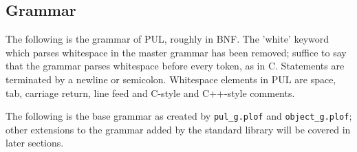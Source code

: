 \subsection{Grammar}

The following is the grammar of PUL, roughly in BNF. The 'white' keyword which parses whitespace in the master grammar has been removed; suffice to say that the grammar parses whitespace before every token, as in C. Statements are terminated by a newline or semicolon. Whitespace elements in PUL are space, tab, carriage return, line feed and C-style and C++-style comments.

The following is the base grammar as created by \texttt{pul\_g.plof} and \texttt{object\_g.plof}; other extensions to the grammar added by the standard library will be covered in later sections.



